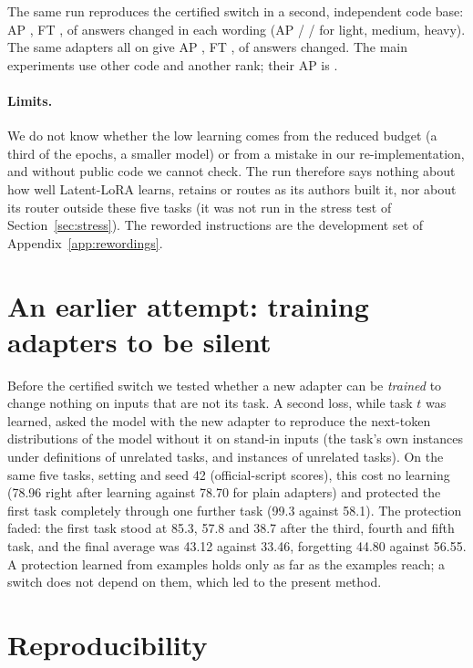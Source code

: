 The same run reproduces the certified switch in a second, independent code base: AP \LatentCertAP{}, FT \LatentCertFT{}, \LatentCertChanged{} of \LatentCompared{} answers changed in each wording (AP \LatentCertAPLight{} / \LatentCertAPMedium{} / \LatentCertAPHeavy{} for light, medium, heavy). The same adapters all on give AP \LatentAllAP{}, FT \LatentAllFT{}, \LatentAllChanged{} of \LatentCompared{} answers changed. The main experiments use other code and another rank; their AP is \FiveCertAP{}.

\paragraph{Limits.} We do not know whether the low learning comes from the reduced budget (a third of the epochs, a smaller model) or from a mistake in our re-implementation, and without public code we cannot check. The run therefore says nothing about how well Latent-LoRA learns, retains or routes as its authors built it, nor about its router outside these five tasks (it was not run in the stress test of Section~\ref{sec:stress}). The reworded instructions are the development set of Appendix~\ref{app:rewordings}.

\FloatBarrier
\section{An earlier attempt: training adapters to be silent}
\label{app:silence}

Before the certified switch we tested whether a new adapter can be \emph{trained} to change nothing on inputs that are not its task. A second loss, while task $t$ was learned, asked the model with the new adapter to reproduce the next-token distributions of the model without it on stand-in inputs (the task's own instances under definitions of unrelated tasks, and instances of unrelated tasks). On the same five tasks, setting and seed 42 (official-script scores), this cost no learning (78.96 right after learning against 78.70 for plain adapters) and protected the first task completely through one further task (99.3 against 58.1). The protection faded: the first task stood at 85.3, 57.8 and 38.7 after the third, fourth and fifth task, and the final average was 43.12 against 33.46, forgetting 44.80 against 56.55. A protection learned from examples holds only as far as the examples reach; a switch does not depend on them, which led to the present method.

\FloatBarrier
\section{Reproducibility}
\label{app:repro}

